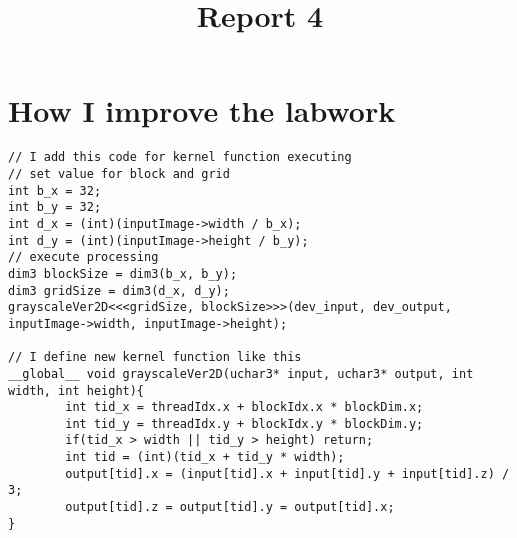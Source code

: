 \documentclass{article}
\title{Report 4}
\date{}
\begin{document}
\maketitle
\section{How I improve the labwork}
\begin{verbatim}
// I add this code for kernel function executing
// set value for block and grid
int b_x = 32;
int b_y = 32;
int d_x = (int)(inputImage->width / b_x);
int d_y = (int)(inputImage->height / b_y);
// execute processing
dim3 blockSize = dim3(b_x, b_y);
dim3 gridSize = dim3(d_x, d_y);
grayscaleVer2D<<<gridSize, blockSize>>>(dev_input, dev_output, inputImage->width, inputImage->height);

// I define new kernel function like this
__global__ void grayscaleVer2D(uchar3* input, uchar3* output, int width, int height){
        int tid_x = threadIdx.x + blockIdx.x * blockDim.x;
        int tid_y = threadIdx.y + blockIdx.y * blockDim.y;
        if(tid_x > width || tid_y > height) return;
        int tid = (int)(tid_x + tid_y * width);
        output[tid].x = (input[tid].x + input[tid].y + input[tid].z) / 3;
        output[tid].z = output[tid].y = output[tid].x;
}
\end{verbatim}
\end{document}
